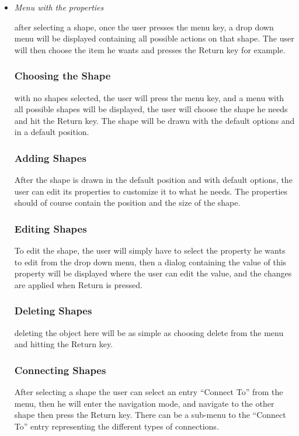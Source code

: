 \begin{itemize}
\item {\it Menu with the properties}
\par \noindent
after selecting a shape, once the user presses the menu key, a drop down menu will be displayed containing all possible actions on that shape. The user will then choose the item he wants and presses the Return key for example.

	
	\subsubsection {Choosing the Shape}
	with no shapes selected, the user will press the menu key, and a menu with all possible shapes will be displayed, the user will choose the shape he needs and hit the Return key. The shape will be drawn with the default options and in a default position.
	
	\subsubsection  {Adding Shapes}
	After the shape is drawn in the default position and with default options, the user can edit its properties to customize it to what he needs. The properties should of course contain the position and the size of the shape.

	\subsubsection {Editing Shapes}
	To edit the shape, the user will simply have to select the property he wants to edit from the drop down menu, then a dialog containing the value of this property will be displayed where the user can edit the value, and the changes are applied when Return is pressed.

	\subsubsection {Deleting Shapes}
	deleting the object here will be as simple as choosing delete from the menu and hitting the Return key.

	\subsubsection {Connecting Shapes}
	After selecting a shape the user can select an entry ``Connect To'' from the menu, then he will enter the navigation mode, and navigate to the other shape then press the Return key. There can be a sub-menu to the ``Connect To'' entry representing the different types of connections.


\end{itemize}
